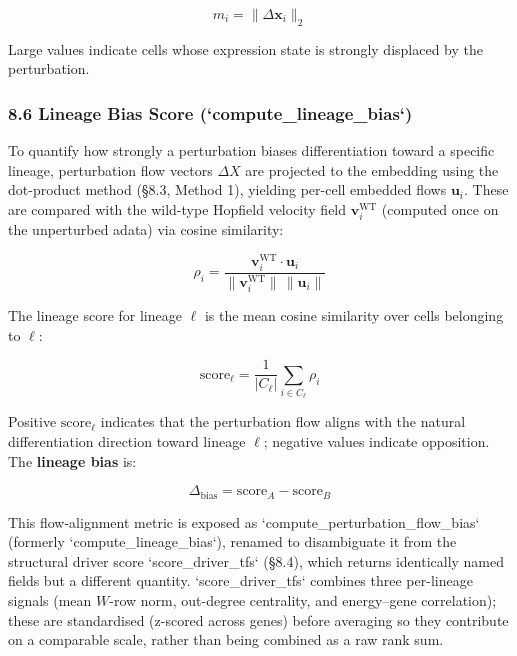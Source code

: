 \documentclass[11pt]{article}
\begin{document}
\begin{equation}
m_i = \|\Delta\mathbf{x}_i\|_2
\end{equation}

Large values indicate cells whose expression state is strongly displaced by the perturbation.


\subsubsection*{8.6 Lineage Bias Score (`compute\_lineage\_bias`)}

To quantify how strongly a perturbation biases differentiation toward a specific lineage, perturbation flow vectors $\Delta X$ are projected to the embedding using the dot-product method (§8.3, Method 1), yielding per-cell embedded flows $\mathbf{u}_i$. These are compared with the wild-type Hopfield velocity field $\mathbf{v}_i^{\mathrm{WT}}$ (computed once on the unperturbed adata) via cosine similarity:

\begin{equation}
\rho_i = \frac{\mathbf{v}_i^{\mathrm{WT}} \cdot \mathbf{u}_i}{\|\mathbf{v}_i^{\mathrm{WT}}\|\,\|\mathbf{u}_i\|} 
\end{equation}

The lineage score for lineage $\ell$ is the mean cosine similarity over cells belonging to $\ell$:

\begin{equation}
\text{score}_\ell = \frac{1}{|C_\ell|}\sum_{i \in C_\ell} \rho_i
\end{equation}

Positive $\text{score}_\ell$ indicates that the perturbation flow aligns with the natural differentiation direction toward lineage $\ell$; negative values indicate opposition. The \textbf{lineage bias} is:

\begin{equation}
\Delta_{\mathrm{bias}} = \text{score}_A - \text{score}_B
\end{equation}


This flow-alignment metric is exposed as `compute\_perturbation\_flow\_bias` (formerly `compute\_lineage\_bias`), renamed to disambiguate it from the structural driver score `score\_driver\_tfs` (§8.4), which returns identically named fields but a different quantity. `score\_driver\_tfs` combines three per-lineage signals (mean $W$-row norm, out-degree centrality, and energy--gene correlation); these are standardised (z-scored across genes) before averaging so they contribute on a comparable scale, rather than being combined as a raw rank sum.
\end{document}
